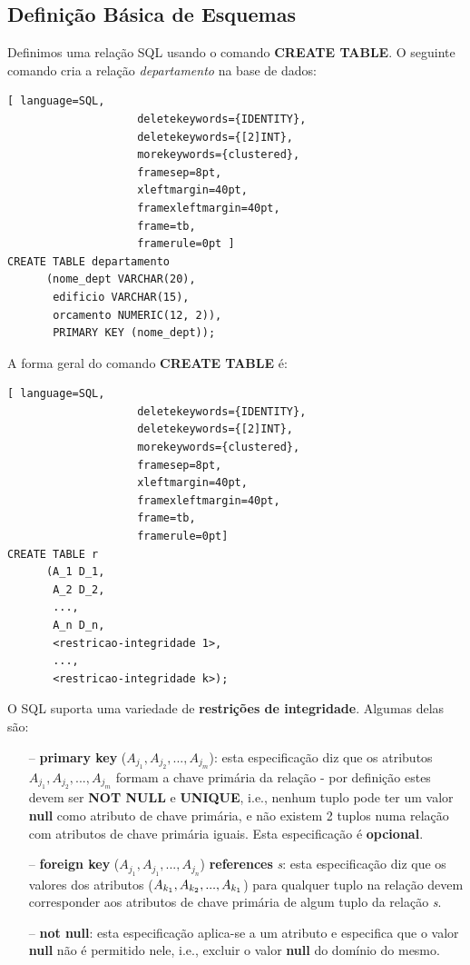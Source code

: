 \documentclass[oneside]{book}
\theoremstyle{definition}
\begin{document}
\subsection{Definição Básica de Esquemas}
Definimos uma relação SQL usando o comando \textbf{CREATE TABLE}. O seguinte comando cria a relação \textit{departamento} na base de dados:
\begin{lstlisting}[ language=SQL,
                    deletekeywords={IDENTITY},
                    deletekeywords={[2]INT},
                    morekeywords={clustered},
                    framesep=8pt,
                    xleftmargin=40pt,
                    framexleftmargin=40pt,
                    frame=tb,
                    framerule=0pt ]
CREATE TABLE departamento 
      (nome_dept VARCHAR(20),
       edificio VARCHAR(15),
       orcamento NUMERIC(12, 2)),
       PRIMARY KEY (nome_dept));
\end{lstlisting}
A forma geral do comando \textbf{CREATE TABLE} é:
\begin{lstlisting}[ language=SQL,
                    deletekeywords={IDENTITY},
                    deletekeywords={[2]INT},
                    morekeywords={clustered},
                    framesep=8pt,
                    xleftmargin=40pt,
                    framexleftmargin=40pt,
                    frame=tb,
                    framerule=0pt]
CREATE TABLE r 
      (A_1 D_1,
       A_2 D_2,
       ...,
       A_n D_n,
       <restricao-integridade 1>,
       ...,
       <restricao-integridade k>);
\end{lstlisting}
O SQL suporta uma variedade de \textbf{restrições de integridade}. Algumas delas são:
\begin{itemize}
    \itemsep0cm
    \item[--]\textbf{primary key} ($A_{j_{1}}, A_{j_{2}}, ..., A_{j_{m}}$): esta especificação diz que os atributos $A_{j_{1}}, A_{j_{2}}, ..., A_{j_{m}}$ formam a chave primária da relação - por definição estes devem ser \textbf{NOT NULL} e \textbf{UNIQUE}, i.e., nenhum tuplo pode ter um valor \textbf{null} como atributo de chave primária, e não existem 2 tuplos numa relação com atributos de chave primária iguais. Esta especificação é \textbf{opcional}.
    \item[--]\textbf{foreign key} ($A_{j_{1}}, A_{j_{1}}, ..., A_{j_{n}}$) \textbf{references} \textit{s}: esta especificação diz que os valores dos atributos ($A_{k_{1}}, A_{k_{2}}, \\ ..., A_{k_{1}}$) para qualquer tuplo na relação devem corresponder aos atributos de chave primária de algum tuplo da relação \textit{s}.
    \item[--]\textbf{not null}: esta especificação aplica-se a um atributo e especifica que o valor \textbf{null} não é permitido nele, i.e., excluir o valor \textbf{null} do domínio do mesmo.
\end{itemize}
\end{document}
